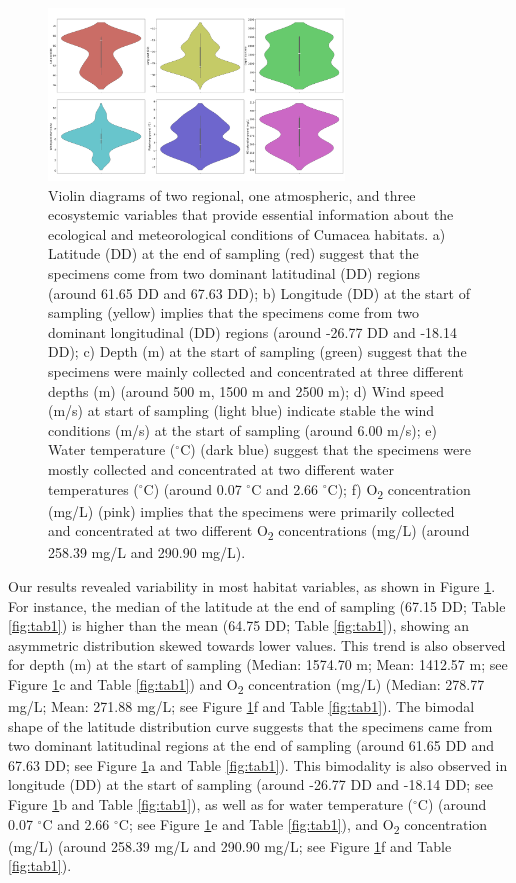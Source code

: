 {\begin{figure}[htbp]
    \centering
    \includegraphics[width=0.7\textwidth]{figure1.jpg}
    \caption{Violin diagrams of two regional, one atmospheric, and three ecosystemic variables that provide essential information about the ecological and meteorological conditions of Cumacea habitats. a) Latitude (DD) at the end of sampling (red) suggest that the specimens come from two dominant latitudinal (DD) regions (around 61.65 DD and 67.63 DD); b) Longitude (DD) at the start of sampling (yellow) implies that the specimens come from two dominant longitudinal (DD) regions (around -26.77 DD and -18.14 DD); c) Depth (m) at the start of sampling (green) suggest that the specimens were mainly collected and concentrated at three different depths (m) (around 500 m, 1500 m and 2500 m); d) Wind speed (m/s) at start of sampling (light blue) indicate stable the wind conditions (m/s) at the start of sampling (around 6.00 m/s); e) Water temperature ($^\circ$C) (dark blue) suggest that the specimens were mostly collected and concentrated at two different water temperatures ($^\circ$C) (around 0.07 $^\circ$C and 2.66 $^\circ$C); f) O\textsubscript{2} concentration (mg/L) (pink) implies that the specimens were primarily collected and concentrated at two different O\textsubscript{2} concentrations (mg/L) (around 258.39 mg/L and 290.90 mg/L). \label{fig:fig3}}
\end{figure}

Our results revealed variability in most habitat variables, as shown in Figure \ref{fig:fig3}. For instance, the median of the latitude at the end of sampling (67.15 DD; Table \ref{fig:tab1}) is higher than the mean (64.75 DD; Table \ref{fig:tab1}), showing an asymmetric distribution skewed towards lower values. This trend is also observed for depth (m) at the start of sampling (Median: 1574.70 m; Mean: 1412.57 m; see Figure \ref{fig:fig3}c and Table \ref{fig:tab1}) and O\textsubscript{2} concentration (mg/L) (Median: 278.77 mg/L; Mean: 271.88 mg/L; see Figure \ref{fig:fig3}f and Table \ref{fig:tab1}). The bimodal shape of the latitude distribution curve suggests that the specimens came from two dominant latitudinal regions at the end of sampling (around 61.65 DD and 67.63 DD; see Figure \ref{fig:fig3}a and Table \ref{fig:tab1}). This bimodality is also observed in longitude (DD) at the start of sampling (around -26.77 DD and -18.14 DD; see Figure \ref{fig:fig3}b and Table \ref{fig:tab1}), as well as for water temperature ($^\circ$C) (around 0.07 $^\circ$C and 2.66 $^\circ$C; see Figure \ref{fig:fig3}e and Table \ref{fig:tab1}), and O\textsubscript{2} concentration (mg/L) (around 258.39 mg/L and 290.90 mg/L; see Figure \ref{fig:fig3}f and Table \ref{fig:tab1}).

}
